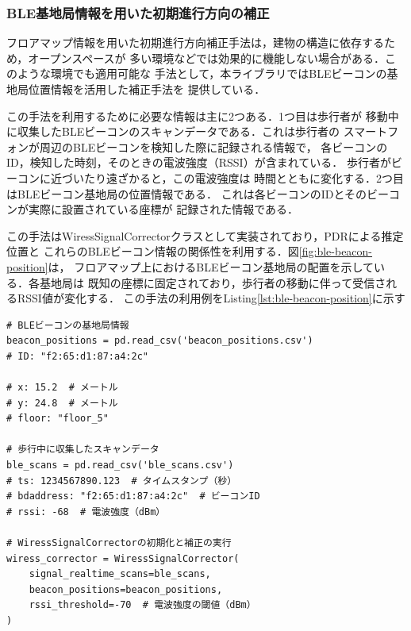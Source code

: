
\subsubsection{BLE基地局情報を用いた初期進行方向の補正}

フロアマップ情報を用いた初期進行方向補正手法は，建物の構造に依存するため，オープンスペースが
多い環境などでは効果的に機能しない場合がある．このような環境でも適用可能な
手法として，本ライブラリではBLEビーコンの基地局位置情報を活用した補正手法を
提供している．

この手法を利用するために必要な情報は主に2つある．1つ目は歩行者が
移動中に収集したBLEビーコンのスキャンデータである．これは歩行者の
スマートフォンが周辺のBLEビーコンを検知した際に記録される情報で，
各ビーコンのID，検知した時刻，そのときの電波強度（RSSI）が含まれている．
歩行者がビーコンに近づいたり遠ざかると，この電波強度は
時間とともに変化する．2つ目はBLEビーコン基地局の位置情報である．
これは各ビーコンのIDとそのビーコンが実際に設置されている座標が
記録された情報である．

この手法はWiressSignalCorrectorクラスとして実装されており，PDRによる推定位置と
これらのBLEビーコン情報の関係性を利用する．図\ref{fig:ble-beacon-position}は，
フロアマップ上におけるBLEビーコン基地局の配置を示している．各基地局は
既知の座標に固定されており，歩行者の移動に伴って受信されるRSSI値が変化する．
この手法の利用例をListing\ref{lst:ble-beacon-position}に示す

\begin{lstlisting}[caption={WiressSignalCorrectorの使用例},label=lst:ble-beacon-position,float=h]
# BLEビーコンの基地局情報
beacon_positions = pd.read_csv('beacon_positions.csv')
# ID: "f2:65:d1:87:a4:2c"

# x: 15.2  # メートル
# y: 24.8  # メートル
# floor: "floor_5"

# 歩行中に収集したスキャンデータ
ble_scans = pd.read_csv('ble_scans.csv')
# ts: 1234567890.123  # タイムスタンプ（秒）
# bdaddress: "f2:65:d1:87:a4:2c"  # ビーコンID
# rssi: -68  # 電波強度（dBm）

# WiressSignalCorrectorの初期化と補正の実行
wiress_corrector = WiressSignalCorrector(
    signal_realtime_scans=ble_scans,
    beacon_positions=beacon_positions,
    rssi_threshold=-70  # 電波強度の閾値（dBm）
)
\end{lstlisting}



